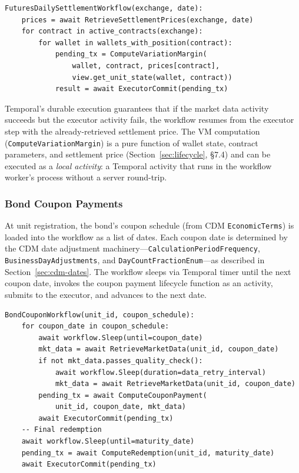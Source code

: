 \documentclass[11pt,a4paper]{article}
\begin{document}
\begin{lstlisting}
FuturesDailySettlementWorkflow(exchange, date):
    prices = await RetrieveSettlementPrices(exchange, date)
    for contract in active_contracts(exchange):
        for wallet in wallets_with_position(contract):
            pending_tx = ComputeVariationMargin(
                wallet, contract, prices[contract],
                view.get_unit_state(wallet, contract))
            result = await ExecutorCommit(pending_tx)
\end{lstlisting}

\noindent Temporal's durable execution guarantees that if the market data activity succeeds but the executor activity fails, the workflow resumes from the executor step with the already-retrieved settlement price. The VM computation (\texttt{ComputeVariationMargin}) is a pure function of wallet state, contract parameters, and settlement price (Section~\ref{sec:lifecycle}, \S7.4) and can be executed as a \emph{local activity}: a Temporal activity that runs in the workflow worker's process without a server round-trip.

\subsubsection{Bond Coupon Payments}

At unit registration, the bond's coupon schedule (from CDM \texttt{EconomicTerms}) is loaded into the workflow as a list of dates. Each coupon date is determined by the CDM date adjustment machinery---\texttt{CalculationPeriodFrequency}, \texttt{BusinessDayAdjustments}, and \texttt{DayCountFractionEnum}---as described in Section~\ref{sec:cdm-dates}. The workflow sleeps via Temporal timer until the next coupon date, invokes the coupon payment lifecycle function as an activity, submits to the executor, and advances to the next date.

\begin{lstlisting}
BondCouponWorkflow(unit_id, coupon_schedule):
    for coupon_date in coupon_schedule:
        await workflow.Sleep(until=coupon_date)
        mkt_data = await RetrieveMarketData(unit_id, coupon_date)
        if not mkt_data.passes_quality_check():
            await workflow.Sleep(duration=data_retry_interval)
            mkt_data = await RetrieveMarketData(unit_id, coupon_date)
        pending_tx = await ComputeCouponPayment(
            unit_id, coupon_date, mkt_data)
        await ExecutorCommit(pending_tx)
    -- Final redemption
    await workflow.Sleep(until=maturity_date)
    pending_tx = await ComputeRedemption(unit_id, maturity_date)
    await ExecutorCommit(pending_tx)
\end{lstlisting}
\end{document}
